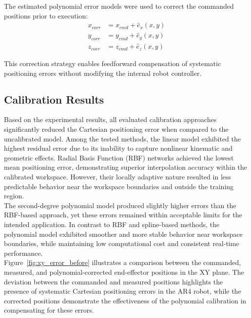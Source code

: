 The estimated polynomial error models were used to correct the commanded positions prior to execution:
\begin{equation}
\begin{aligned}
x_{corr} &= x_{cmd} + \hat{e}_x(x,y) \\
y_{corr} &= y_{cmd} + \hat{e}_y(x,y) \\
z_{corr} &= z_{cmd} + \hat{e}_z(x,y)
\end{aligned}
\end{equation}

This correction strategy enables feedforward compensation of systematic positioning errors without modifying the internal robot controller.

\subsection{Calibration Results}

Based on the experimental results, all evaluated calibration approaches significantly reduced the Cartesian positioning error when compared to the uncalibrated model. Among the tested methods, the linear model exhibited the highest residual error due to its inability to capture nonlinear kinematic and geometric effects. Radial Basis Function (RBF) networks achieved the lowest mean positioning error, demonstrating superior interpolation accuracy within the calibrated workspace. However, their locally adaptive nature resulted in less predictable behavior near the workspace boundaries and outside the training region. \\

The second-degree polynomial model produced slightly higher errors than the RBF-based approach, yet these errors remained within acceptable limits for the intended application. In contrast to RBF and spline-based methods, the polynomial model exhibited smoother and more stable behavior near workspace boundaries, while maintaining low computational cost and consistent real-time performance. \\

Figure~\ref{fig:xy_error_before} illustrates a comparison between the commanded, measured, and polynomial-corrected end-effector positions in the XY plane. The deviation between the commanded and measured positions highlights the presence of systematic Cartesian positioning errors in the AR4 robot, while the corrected positions demonstrate the effectiveness of the polynomial calibration in compensating for these errors.

